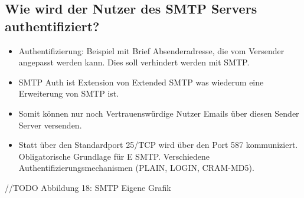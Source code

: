 \subsection*{Wie wird der Nutzer des SMTP Servers authentifiziert?}
\begin{itemize}
    \item Authentifizierung: Beispiel mit Brief Absenderadresse, die vom Versender angepasst werden kann. Dies soll verhindert werden mit SMTP.
    \item SMTP Auth ist Extension von Extended SMTP was wiederum eine Erweiterung von SMTP ist.
    \item Somit können nur noch Vertrauenswürdige Nutzer Emails über diesen Sender Server versenden.
    \item Statt über den Standardport 25/TCP wird über den Port 587 kommuniziert. Obligatorische Grundlage für E SMTP. Verschiedene Authentifizierungsmechanismen (PLAIN, LOGIN, CRAM-MD5).
\end{itemize}
//TODO Abbildung 18: SMTP Eigene Grafik


